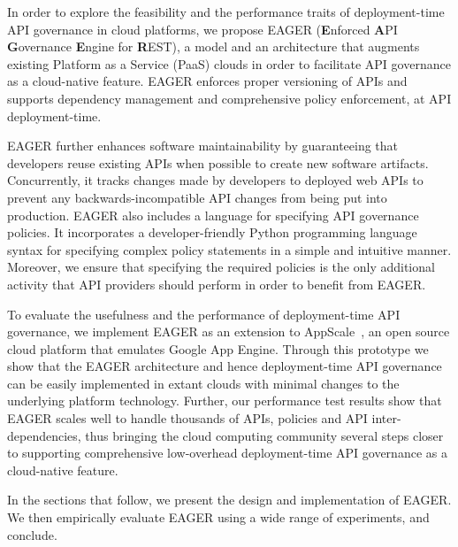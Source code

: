 In order to explore the feasibility and the performance traits of deployment-time
API governance in cloud platforms,
we propose EAGER ({\bf E}nforced {\bf A}PI {\bf G}overnance
{\bf E}ngine for {\bf R}EST), a model and an architecture that augments existing
Platform as a Service (PaaS) clouds in order to facilitate API governance as a 
cloud-native feature. EAGER enforces proper versioning of APIs and supports dependency 
management and comprehensive policy enforcement, at API deployment-time.

EAGER further enhances software maintainability by guaranteeing that 
developers reuse existing APIs when possible to create new software artifacts. 
Concurrently, it
tracks changes made by developers to deployed web APIs to prevent
any backwards-incompatible API changes from being put into production.
EAGER also includes a language for specifying 
API governance policies.  It incorporates a developer-friendly 
Python programming language syntax for 
specifying complex policy statements in a simple and 
intuitive manner. Moreover, we ensure that specifying the required policies 
is the only additional activity that API providers should perform in
order to benefit from EAGER.

To evaluate the usefulness and the performance of deployment-time API governance, 
we implement EAGER as an extension to AppScale~\cite{appscale13}, 
an open source cloud platform that emulates Google App Engine. Through this
prototype we show that the EAGER 
architecture and hence deployment-time API governance can be easily implemented 
in extant clouds with minimal changes to the underlying platform technology. Further,
our performance test results show that EAGER scales well to handle thousands of APIs,
policies and API inter-dependencies, thus bringing the cloud computing community several
steps closer to supporting comprehensive low-overhead deployment-time API governance
as a cloud-native feature.

In the sections that follow, we present the design and implementation of
EAGER. We then empirically evaluate EAGER using a wide range of
experiments, and conclude.

